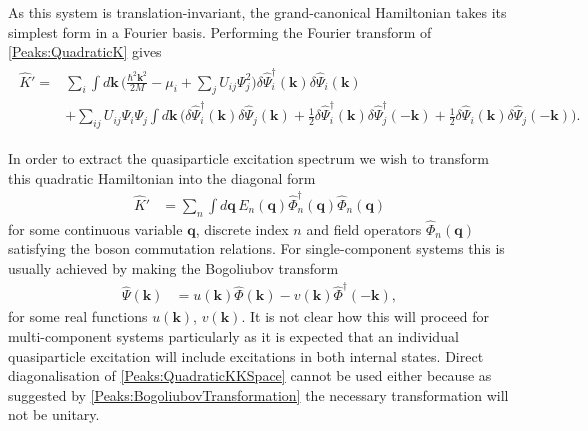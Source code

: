As this system is translation-invariant, the grand-canonical Hamiltonian takes its simplest form in a Fourier basis. Performing the Fourier transform of \eqref{Peaks:QuadraticK} gives
\begin{align}
    \begin{split}
        \hat{K}' =& \sum_i \int d\mathbf{k}\, \bigg(\frac{\hbar^2 \mathbf{k}^2}{2M} - \mu_i + \sum_j U_{ij} \Psi_j^2\bigg) \delta\hat{\Psi}_i^\dagger(\mathbf{k}) \delta\hat{\Psi}_i(\mathbf{k}) \\
        &+ \sum_{i j} U_{i j}\Psi_i \Psi_j\int d\mathbf{k}\, \Big( \delta\hat{\Psi}_i^\dagger(\mathbf{k}) \delta\hat{\Psi}_j(\mathbf{k}) + \frac{1}{2}\delta\hat{\Psi}_i^\dagger(\mathbf{k}) \delta\hat{\Psi}_j^\dagger (-\mathbf{k}) + \frac{1}{2} \delta\hat{\Psi}_i(\mathbf{k}) \delta\hat{\Psi}_j(-\mathbf{k})\Big) .
    \end{split}
    \label{Peaks:QuadraticKKSpace}
\end{align}

In order to extract the quasiparticle excitation spectrum we wish to transform this quadratic Hamiltonian into the diagonal form
\begin{align}
    \hat{K}' &= \sum_n \int d\mathbf{q}\, E_n(\mathbf{q}) \hat{\Phi}_n^\dagger(\mathbf{q}) \hat{\Phi}_n(\mathbf{q}) \label{Peaks:DesiredQuadraticForm}
\end{align}
for some continuous variable $\mathbf{q}$, discrete index $n$ and field operators $\hat{\Phi}_n(\mathbf{q})$ satisfying the boson commutation relations. For single-component systems this is usually achieved by making the Bogoliubov transform
\begin{align}
    \hat{\Psi}(\mathbf{k}) &= u(\mathbf{k}) \hat{\Phi}(\mathbf{k}) - v(\mathbf{k}) \hat{\Phi}^\dagger(-\mathbf{k}), \label{Peaks:BogoliubovTransformation}
\end{align}
for some real functions $u(\mathbf{k})$, $v(\mathbf{k})$. It is not clear how this will proceed for multi-component systems particularly as it is expected that an individual quasiparticle excitation will include excitations in both internal states. Direct diagonalisation of \eqref{Peaks:QuadraticKKSpace} cannot be used either because as suggested by \eqref{Peaks:BogoliubovTransformation} the necessary transformation will not be unitary.

